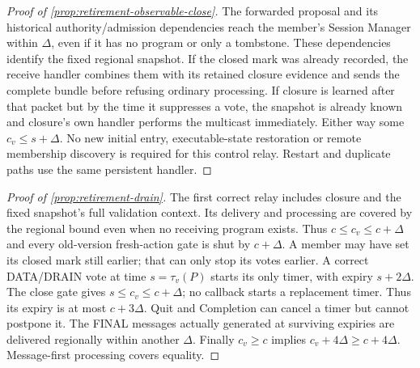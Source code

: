 \documentclass[11pt,a4paper]{article}
\begin{document}
\begin{proof}[Proof of \cref{prop:retirement-observable-close}]
The forwarded proposal and its historical authority/admission dependencies
reach the member's Session Manager within $\Delta$, even if it has
no program or only a tombstone. These dependencies identify the fixed
regional snapshot. If the closed mark was already recorded, the receive handler
combines them with its retained closure evidence and sends the complete
bundle before refusing ordinary processing. If closure is learned after
that packet but by the time it suppresses a vote, the snapshot is already
known and closure's own handler performs the multicast immediately.
Either way some $c_v\le s+\Delta$. No new initial entry, executable-state
restoration or remote membership discovery is required for this control
relay. Restart and duplicate paths use the same persistent handler.
\end{proof}

\begin{proof}[Proof of \cref{prop:retirement-drain}]
The first correct relay includes closure and the fixed snapshot's full
validation context. Its delivery and processing are covered by the
regional bound even when no receiving program exists. Thus
$c\le c_v\le c+\Delta$ and every old-version fresh-action gate is shut
by $c+\Delta$. A member may have set its closed mark still earlier; that can only
stop its votes earlier. A correct DATA/DRAIN vote at time
$s=\tau_v(P)$ starts its only timer, with expiry $s+2\Delta$.
The close gate gives $s\le c_v\le c+\Delta$; no callback starts a
replacement timer. Thus its expiry is at most $c+3\Delta$.
Quit and Completion can cancel a timer but cannot postpone it.
The FINAL messages actually generated at surviving expiries are
delivered regionally within another $\Delta$. Finally $c_v\ge c$
implies $c_v+4\Delta\ge c+4\Delta$. Message-first processing covers equality.
\end{proof}
\end{document}
